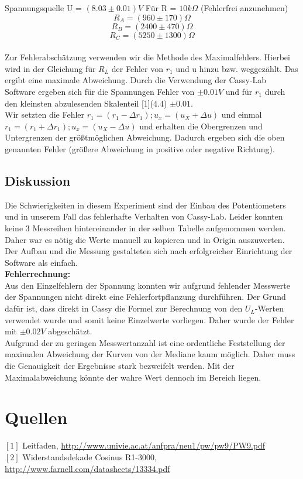 \documentclass[12pt,a4paper]{article}
\begin{document}
\begin{multicols}{2}
\noindent
Spannungsquelle U = $(8.03 \pm 0.01)V$
Für R = $10k\Omega$ (Fehlerfrei anzunehmen)\\
$$R_A =  (960 \pm 170)\Omega$$
$$R_B =  (2400 \pm 470)\Omega$$
$$R_C =  (5250\pm 1300)\Omega$$
\\
Zur Fehlerabschätzung verwenden wir die Methode des Maximalfehlers. Hierbei wird in der Gleichung für $R_L$ der Fehler von $r_1$ und u hinzu bzw. weggezählt. Das ergibt eine maximale Abweichung.
Durch die Verwendung der Cassy-Lab Software ergeben sich für die Spannungen Fehler von $\pm 0.01V$ und für $r_1$ durch den kleinsten abzulesenden Skalenteil [1](4.4) $\pm 0.01$.\\

Wir setzten die Fehler $r_1 = (r_1- \Delta r_1); u_x = (u_X + \Delta u)$ und einmal $r_1 = (r_1+ \Delta r_1); u_x = (u_X - \Delta u)$ und erhalten die Obergrenzen und Untergrenzen der größtmöglichen Abweichung.
Dadurch ergeben sich die oben genannten Fehler (größere Abweichung in positive oder negative Richtung).


\subsection{Diskussion}
Die Schwierigkeiten in diesem Experiment sind der Einbau des Potentiometers und in unserem Fall das fehlerhafte Verhalten von Cassy-Lab. Leider konnten keine 3 Messreihen hintereinander in der selben Tabelle aufgenommen werden. Daher war es nötig die Werte manuell zu kopieren und in Origin auszuwerten. Der Aufbau und die Messung gestalteten sich nach erfolgreicher Einrichtung der Software als einfach. \\
\textbf{Fehlerrechnung:}\\
Aus den Einzelfehlern der Spannung konnten wir aufgrund fehlender Messwerte der Spannungen nicht direkt eine Fehlerfortpflanzung durchführen. Der Grund dafür ist, dass direkt in Cassy die Formel zur Berechnung von den $U_L$-Werten verwendet wurde und somit keine Einzelwerte vorliegen. Daher wurde der Fehler mit $\pm 0.02V$ abgeschätzt.\\
Aufgrund der zu geringen Messwertanzahl ist eine ordentliche Feststellung der maximalen Abweichung der Kurven von der Mediane kaum möglich. Daher muss die Genauigkeit der Ergebnisse stark bezweifelt werden. Mit der Maximalabweichung könnte der wahre Wert dennoch im Bereich liegen.


\section{Quellen}
$[1]$ Leitfaden, \url{http://www.univie.ac.at/anfpra/neu1/pw/pw9/PW9.pdf}\\
$[2]$ Widerstandsdekade Cosinus R1-3000, \url{http://www.farnell.com/datasheets/13334.pdf}\\

\end{multicols}
\end{document}
